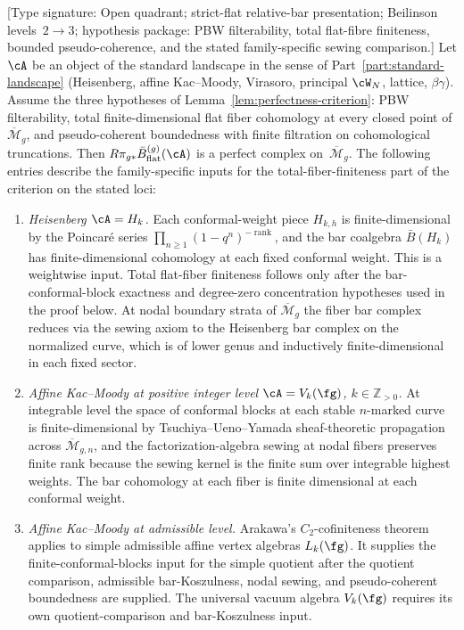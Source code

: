 \begin{proposition}
\label{prop:perfectness-standard-landscape}
%
\textup{[Type signature: Open quadrant; strict-flat relative-bar
presentation; Beilinson levels~\(2\to3\); hypothesis package: PBW
filterability, total flat-fibre finiteness, bounded
pseudo-coherence, and the stated family-specific sewing comparison.]}
Let $\cA$ be an object of the standard landscape in the sense of
Part~\ref{part:standard-landscape}
\textup{(}Heisenberg, affine Kac--Moody,
Virasoro, principal $\cW_N$, lattice, $\beta\gamma$\textup{)}. Assume
the three hypotheses of
Lemma~\textup{\ref{lem:perfectness-criterion}}: PBW filterability,
total finite-dimensional flat fiber cohomology at every closed point
of $\overline{\mathcal{M}}_g$, and pseudo-coherent boundedness with
finite filtration on cohomological truncations. Then
$R\pi_{g*}\bar{B}^{(g)}_{\mathrm{flat}}(\cA)$ is a perfect complex
on~$\overline{\mathcal{M}}_g$. The following entries describe the
family-specific inputs for the total-fiber-finiteness part of the
criterion on the stated loci:
\begin{enumerate}[label=\textup{(\alph*)}]
\item \emph{Heisenberg $\cA = H_k$.} Each conformal-weight piece
 $H_{k,h}$ is finite-dimensional by the Poincar\'e series
 $\prod_{n\geq 1}(1-q^n)^{-\operatorname{rank}}$, and the bar
 coalgebra $\bar{B}(H_k)$ has finite-dimensional cohomology at each
 fixed conformal weight. This is a weightwise input. Total
 flat-fiber finiteness follows only after the
 bar-conformal-block exactness and degree-zero concentration
 hypotheses used in the proof below. At nodal boundary strata of
 $\overline{\mathcal{M}}_g$ the fiber bar complex reduces via the
 sewing axiom to the Heisenberg bar complex on the normalized
 curve, which is of lower genus and inductively
 finite-dimensional in each fixed sector.
\item \emph{Affine Kac--Moody at positive integer level
 $\cA = V_k(\fg)$, $k \in \mathbb{Z}_{> 0}$.} At integrable level
 the space of conformal blocks at each stable $n$-marked curve is
 finite-dimensional by Tsuchiya--Ueno--Yamada sheaf-theoretic
 propagation across $\overline{\mathcal{M}}_{g,n}$, and the
 factorization-algebra sewing at nodal fibers preserves finite
 rank because the sewing kernel is the finite sum over integrable
 highest weights. The bar cohomology at each fiber is finite
 dimensional at each conformal weight.

\item \emph{Affine Kac--Moody at admissible level.} Arakawa's
 $C_2$-cofiniteness theorem applies to simple admissible affine
 vertex algebras $L_k(\fg)$. It supplies the finite-conformal-blocks
 input for the simple quotient after the quotient comparison,
 admissible bar-Koszulness, nodal sewing, and pseudo-coherent
 boundedness are supplied. The universal vacuum algebra
 $V_k(\fg)$ requires its own quotient-comparison and bar-Koszulness
 input.
\end{enumerate}
\end{proposition}

